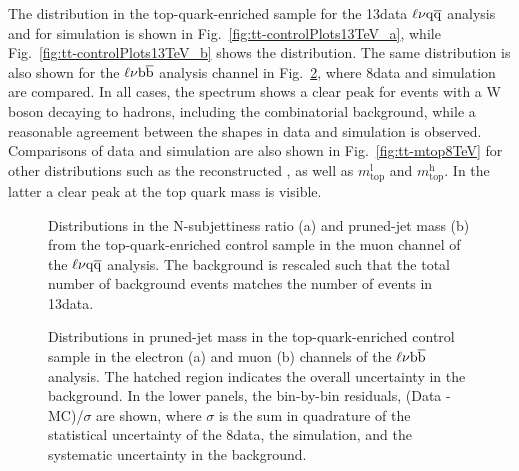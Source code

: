 The \mJ distribution in the top-quark-enriched sample for the 13\TeV data $\ell\nu\mathrm{q}\overline{\mathrm{q}}$ analysis and for simulation is shown in Fig.~\ref{fig:tt-controlPlots13TeV_a}, while Fig.~\ref{fig:tt-controlPlots13TeV_b} shows the \nsubj distribution.
The same distribution is also shown for the $\ell\nu{\mathrm{b}\overline{\mathrm{b}}}$ analysis channel in Fig.~\ref{fig:tt-controlPlots8TeV}, where 8\TeV data and simulation are compared.
In all cases, the \mJ spectrum shows a clear peak for events with a W boson decaying to hadrons, including the combinatorial background, while a reasonable agreement between the shapes in data and simulation is observed.
Comparisons of data and simulation are also shown in Fig.~\ref{fig:tt-mtop8TeV} for other distributions such as the reconstructed \mlvj, as well as $m_\mathrm{top}^\mathrm{l}$ and $m_\mathrm{top}^\mathrm{h}$.
In the latter a clear peak at the top quark mass is visible.

\begin{figure}[!htb]
\centering
{}
\caption{Distributions in the N-subjettiness ratio \nsubj (a) and pruned-jet mass \mJ (b) from the top-quark-enriched control sample in the muon channel of the $\ell\nu\mathrm{q}\overline{\mathrm{q}}$ analysis. The \ttbar background is rescaled such that the total number of background events matches the number of events in 13\TeV data.}
\label{fig:tt-controlPlots13TeV}
\end{figure}

\begin{figure}[!htb]
\centering
{}
\caption{Distributions in pruned-jet mass \mJ in the top-quark-enriched control sample in the electron (a) and muon (b) channels of the $\ell\nu{\mathrm{b}\overline{\mathrm{b}}}$ analysis. The hatched region indicates the overall uncertainty in the background. In the lower panels, the bin-by-bin residuals, (Data - MC)/$\sigma$ are shown, where $\sigma$ is the sum in quadrature of the statistical uncertainty of the 8\TeV data, the simulation, and the systematic uncertainty in the \ttbar background.}
\label{fig:tt-controlPlots8TeV}
\end{figure}


